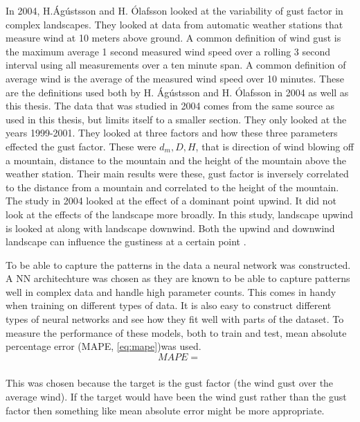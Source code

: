In 2004, H.Ágústsson and H. Ólafsson looked at the variability of gust factor in complex landscapes. They looked at data from automatic weather stations that measure wind at 10 meters above ground. A common definition of wind gust is the maximum average 1 second measured wind speed over a rolling 3 second interval using all measurements over a ten minute span. A common definition of average wind is the average of the measured wind speed over 10 minutes. These are the definitions used both by H. Ágústsson and H. Ólafsson in 2004 as well as this thesis. The data that was studied in 2004 comes from the same source as used in this thesis, but limits itself to a smaller section. They only looked at the years 1999-2001. They looked at three factors and how these three parameters effected the gust factor. These were $d_m, D, H$, that is direction of wind blowing off a mountain, distance to the mountain and the height of the mountain above the weather station. Their main results were these, gust factor is inversely correlated to the distance from a mountain and correlated to the height of the mountain. The study in 2004 looked at the effect of a dominant point upwind. It did not look at the effects of the landscape more broadly. In this study, landscape upwind is looked at along with landscape downwind. Both the upwind and downwind landscape can influence the gustiness at a certain point \cite{GNP_vidtal}.

To be able to capture the patterns in the data a neural network was constructed. A NN architechture was chosen as they are known to be able to capture patterns well in complex data and handle high parameter counts. This comes in handy when training on different types of data. It is also easy to construct different types of neural networks and see how they fit well with parts of the dataset. To measure the performance of these models, both to train and test, mean absolute percentage error (MAPE, \ref{eq:mape})was used. 
\begin{equation}
    \label{eq:mape}
    MAPE = \frac{}{}
\end{equation}

This was chosen because the target is the gust factor (the wind gust over the average wind). If the target would have been the wind gust rather than the gust factor then something like mean absolute error might be more appropriate.